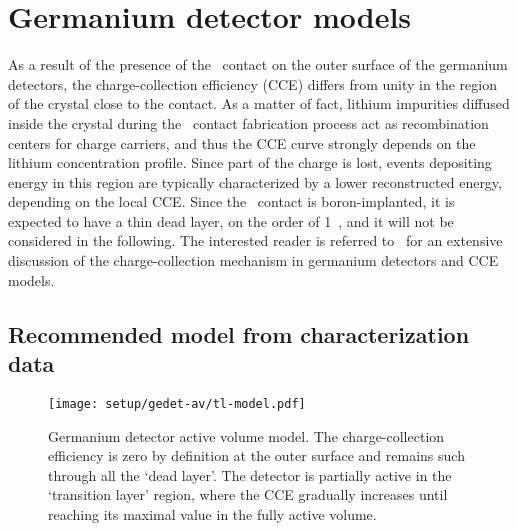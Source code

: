 
\chapter{Germanium detector models}%
\label{apdx:gedetav}

As a result of the presence of the \nplus\ contact on the outer surface of the germanium
detectors, the charge-collection efficiency (CCE) differs from unity in the region of the
crystal close to the contact. As a matter of fact, lithium impurities diffused inside the
crystal during the \nplus\ contact fabrication process act as recombination centers for
charge carriers, and thus the CCE curve strongly depends on the lithium concentration
profile. Since part of the charge is lost, events depositing energy in this region are
typically characterized by a lower reconstructed energy, depending on the local CCE. Since
the \pplus\ contact is boron-implanted, it is expected to have a thin dead layer, on the
order of 1~\mum, and it will not be considered in the following. The interested reader is
referred to~\cite{Lehnert2016} for an extensive discussion of the charge-collection
mechanism in germanium detectors and CCE models.

\section{Recommended model from characterization data}%
\label{sec:gedetav:chardata}

\begin{figure}
  \centering
  \texttt{[image: setup/gedet-av/tl-model.pdf]}
  \caption{%
    Germanium detector active volume model. The charge-collection efficiency is zero by
    definition at the outer surface and remains such through all the `dead layer'. The
    detector is partially active in the `transition layer' region, where the CCE gradually
    increases until reaching its maximal value in the fully active volume.
  }\label{fig:gedetav:tl-model}
\end{figure}

